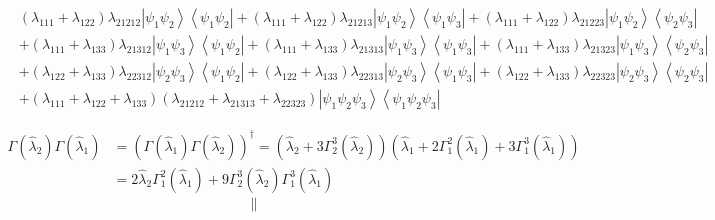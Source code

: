\documentclass[aps,preprint]{revtex4}%
\begin{document}
\begin{align}
& \left(  \lambda_{111}+\lambda_{122}\right)  \lambda_{21212}\left\vert
\psi_{1}\psi_{2}\right\rangle \left\langle \psi_{1}\psi_{2}\right\vert
+\left(  \lambda_{111}+\lambda_{122}\right)  \lambda_{21213}\left\vert
\psi_{1}\psi_{2}\right\rangle \left\langle \psi_{1}\psi_{3}\right\vert
+\left(  \lambda_{111}+\lambda_{122}\right)  \lambda_{21223}\left\vert
\psi_{1}\psi_{2}\right\rangle \left\langle \psi_{2}\psi_{3}\right\vert
\nonumber\\
& +\left(  \lambda_{111}+\lambda_{133}\right)  \lambda_{21312}\left\vert
\psi_{1}\psi_{3}\right\rangle \left\langle \psi_{1}\psi_{2}\right\vert
+\left(  \lambda_{111}+\lambda_{133}\right)  \lambda_{21313}\left\vert
\psi_{1}\psi_{3}\right\rangle \left\langle \psi_{1}\psi_{3}\right\vert
+\left(  \lambda_{111}+\lambda_{133}\right)  \lambda_{21323}\left\vert
\psi_{1}\psi_{3}\right\rangle \left\langle \psi_{2}\psi_{3}\right\vert
\nonumber\\
& +\left(  \lambda_{122}+\lambda_{133}\right)  \lambda_{22312}\left\vert
\psi_{2}\psi_{3}\right\rangle \left\langle \psi_{1}\psi_{2}\right\vert
+\left(  \lambda_{122}+\lambda_{133}\right)  \lambda_{22313}\left\vert
\psi_{2}\psi_{3}\right\rangle \left\langle \psi_{1}\psi_{3}\right\vert
+\left(  \lambda_{122}+\lambda_{133}\right)  \lambda_{22323}\left\vert
\psi_{2}\psi_{3}\right\rangle \left\langle \psi_{2}\psi_{3}\right\vert
\nonumber\\
& +\left(  \lambda_{111}+\lambda_{122}+\lambda_{133}\right)  \left(
\lambda_{21212}+\lambda_{21313}+\lambda_{22323}\right)  \left\vert \psi
_{1}\psi_{2}\psi_{3}\right\rangle \left\langle \psi_{1}\psi_{2}\psi
_{3}\right\vert
\end{align}
%

\begin{align}
\Gamma\left(  \hat{\lambda}_{2}\right)  \Gamma\left(  \hat{\lambda}%
_{1}\right)    & =\left(  \Gamma\left(  \hat{\lambda}_{1}\right)
\Gamma\left(  \hat{\lambda}_{2}\right)  \right)  ^{\dagger}=\left(
\hat{\lambda}_{2}+3\Gamma_{2}^{3}\left(  \hat{\lambda}_{2}\right)  \right)
\left(  \hat{\lambda}_{1}+2\Gamma_{1}^{2}\left(  \hat{\lambda}_{1}\right)
+3\Gamma_{1}^{3}\left(  \hat{\lambda}_{1}\right)  \right)  \nonumber\\
& =2\hat{\lambda}_{2}\Gamma_{1}^{2}\left(  \hat{\lambda}_{1}\right)
+9\Gamma_{2}^{3}\left(  \hat{\lambda}_{2}\right)  \Gamma_{1}^{3}\left(
\hat{\lambda}_{1}\right)
\end{align}%
\[
\parallel
\]
%
\end{document}
